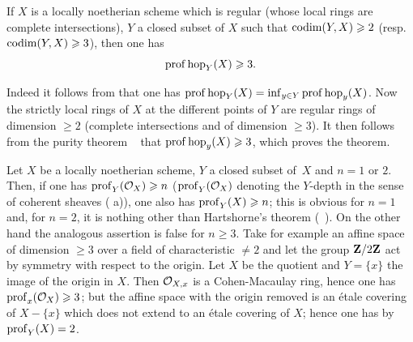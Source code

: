 \begin{theorem} \label{XIV.1.11}
If $X$ is a locally noetherian scheme which is regular (\resp whose local rings are complete intersections), $Y$ a closed subset of $X$ such that $\operatorname{codim}(Y, X)\geqslant 2$ (resp.\ \hbox{$\operatorname{codim}(Y, X)\geqslant3$}), then one has
$$
\operatorname{prof} \operatorname{hop}_Y(X)\geqslant 3.
$$
\end{theorem}

Indeed it follows from  that one has $\operatorname{prof} \operatorname{hop}_Y(X)=\inf_{y\in Y} \operatorname{prof} \operatorname{hop}_y(X)$. Now the strictly local rings of $X$ at the different points of $Y$ are regular rings of dimension $\geq 2$ (\resp complete intersections and of dimension $\geq 3$). It then follows from the purity theorem ~ that $\operatorname{prof} \operatorname{hop}_y(X)\geqslant 3$, which proves the theorem.

\begin{example} \label{XIV.1.12}
Let $X$ be a locally noetherian scheme, $Y$ a closed subset of~$X$ and $n=1$ or $2$. Then, if one has $\operatorname{prof}_Y(\mathcal{O}_X)\geqslant n$ ($\operatorname{prof}_Y(\mathcal{O}_X)$ denoting the $Y$-depth in the sense of coherent sheaves ( a)), one also has $\operatorname{prof}_Y(X)\geqslant n$; this is obvious for $n=1$ and, for $n=2$, it is nothing other than Hartshorne's theorem (~). On the other hand the analogous assertion is false for $n\geq 3$. Take for example an affine space of dimension $\geq 3$ over a field of characteristic $\neq 2$ and let the group $\mathbf{Z}/2\mathbf{Z}$ act by symmetry with respect to the origin. Let $X$ be the quotient and $Y=\{x\}$ the image of the origin in $X$. Then ${\mathcal O}_{X, x}$ is a Cohen-Macaulay ring, hence one has $\operatorname{prof}_x(\mathcal{O}_X)\geqslant 3$; but the affine space with the origin removed is an \'etale covering of $X-\{x\}$ which does not extend to an \'etale covering of $X$; hence one has by  $\operatorname{prof}_Y(X)=2$.
\end{example}

